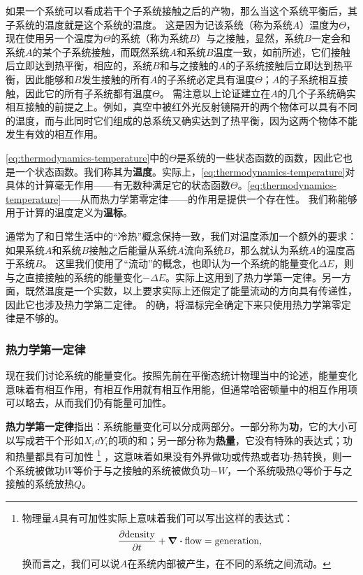 \documentclass[hyperref, UTF8, a4paper]{ctexart}
\begin{document}
如果一个系统可以看成若干个子系统接触之后的产物，那么当这个系统平衡后，其子系统的温度就是这个系统的温度。
这是因为记该系统（称为系统$A$）温度为$\Theta$，现在使用另一个温度为$\Theta$的系统（称为系统$B$）与之接触，显然，系统$B$一定会和系统$A$的某个子系统接触，而既然系统$A$和系统$B$温度一致，如前所述，它们接触后立即达到热平衡，相应的，系统$B$和与之接触的$A$的子系统接触后立即达到热平衡，因此能够和$B$发生接触的所有$A$的子系统必定具有温度$\Theta$；$A$的子系统相互接触，因此它的所有子系统都有温度$\Theta$。
需注意以上论证建立在$A$的几个子系统确实相互接触的前提之上。例如，真空中被红外光反射镜隔开的两个物体可以具有不同的温度，而与此同时它们组成的总系统又确实达到了热平衡，因为这两个物体不能发生有效的相互作用。

\eqref{eq:thermodynamics-temperature}中的$\Theta$是系统的一些状态函数的函数，因此它也是一个状态函数。我们称其为\textbf{温度}。实际上，\eqref{eq:thermodynamics-temperature}对具体的计算毫无作用——有无数种满足它的状态函数$\Theta$。\eqref{eq:thermodynamics-temperature}——从而热力学第零定律——的作用是提供一个存在性。
我们称能够用于计算的温度定义为\textbf{温标}。

通常为了和日常生活中的“冷热”概念保持一致，我们对温度添加一个额外的要求：如果系统$A$和系统$B$接触之后能量从系统$A$流向系统$B$，那么就认为系统$A$的温度高于系统$B$。
这里我们使用了“流动”的概念，也即认为一个系统的能量变化$\Delta E$，则与之直接接触的系统的能量变化$-\Delta E$。实际上这用到了热力学第一定律。另一方面，既然温度是一个实数，以上要求实际上还假定了能量流动的方向具有传递性，因此它也涉及热力学第二定律。
的确，将温标完全确定下来只使用热力学第零定律是不够的。

\subsubsection{热力学第一定律}

现在我们讨论系统的能量变化。按照先前在平衡态统计物理当中的论述，能量变化意味着有相互作用，有相互作用就有相互作用能，但通常哈密顿量中的相互作用项可以略去，从而我们仍有能量可加性。

\textbf{热力学第一定律}指出：系统能量变化可以分成两部分。一部分称为\textbf{功}，它的大小可以写成若干个形如$X_i \dd{Y_i}$的项的和；另一部分称为\textbf{热量}，它没有特殊的表达式；功和热量都具有可加性%
\footnote{
    物理量$A$具有可加性实际上意味着我们可以写出这样的表达式：
    \[
        \pdv{\text{density}}{t} + \div{\text{flow}} = \text{generation},
    \]
    换而言之，我们可以说$A$在系统内部被产生，在不同的系统之间流动。
}
，这意味着如果没有外界做功或传热或者功-热转换，则一个系统被做功$W$等价于与之接触的系统被做负功$-W$，一个系统吸热$Q$等价于与之接触的系统放热$Q$。
\end{document}
